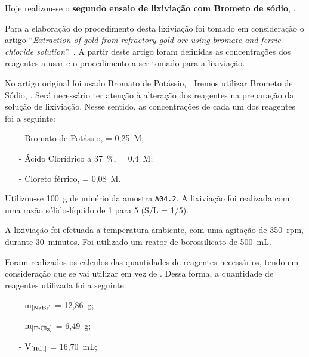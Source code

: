 
\label{day:14-janeiro-2025}

Hoje realizou-se o \textbf{segundo ensaio de lixiviação com Brometo de sódio}, \bromo{}. 

Para a elaboração do procedimento desta lixiviação foi tomado em consideração o artigo ``\emph{Extraction of gold from refractory gold ore using bromate and ferric chloride solution}''~\cite{bromo2_2019}.
A partir deste artigo foram definidas as concentrações dos reagentes a usar e o procedimento a ser tomado para a lixiviação.

No artigo original foi usado Bromato de Potássio, \bromopot{}.
Iremos utilizar Brometo de Sódio, \bromo{}.
Será necessário ter atenção à alteração dos reagentes na preparação da solução de lixiviação.
Nesse sentido, as concentrações de cada um dos reagentes foi a seguinte:

\begin{itemize}
    \item[-] Bromato de Potássio, \bromopot{} = 0,25~M;
    \item[-] Ácido Clorídrico a 37~\%, \acl{} = 0,4~M;
    \item[-] Cloreto férrico, \cloretofe{} = 0,08~M. 
\end{itemize}

Utilizou-se 100~g de minério da amostra \texttt{A04.2}.
A lixiviação foi realizada com uma razão sólido-líquido de 1 para 5 (S/L = 1/5).

A lixiviação foi efetuada a temperatura ambiente, com uma agitação de 350~rpm, durante 30~minutos.
Foi utilizado um reator de borossilicato de 500~mL.

Foram realizados os cálculos das quantidades de reagentes necessários, tendo em consideração que se vai utilizar \bromo{} em vez de \bromopot{}.
Dessa forma, a quantidade de reagentes utilizada foi a seguinte:


\begin{itemize}
    \item[-] $\mathrm{m}_{\left[\bromo{}\right]}$ = 12,86~g;
    \item[-] $\mathrm{m}_{\left[\cloretofe{}\right]}$ = 6,49~g;
    \item[-] $\mathrm{V}_{\left[\acl{}\right]}$ = 16,70~mL; 
\end{itemize}

